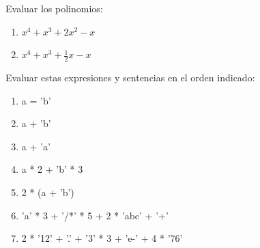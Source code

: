 Evaluar los polinomios:

\begin{enumerate}
\item $x^4 + x^3 + 2x^2 − x$
\item $x^4 + x^3 + \frac{1}{2}x − x$
\end{enumerate}

Evaluar estas expresiones y sentencias en el orden indicado:

\begin{enumerate}
\item a = 'b'
\item a + 'b'
\item a + 'a'
\item a * 2 + 'b' * 3
\item 2 * (a + 'b')
\item 'a' * 3 + '/*' * 5 + 2 * 'abc' + '+'
\item 2 * '12' + '.' + '3' * 3 + 'e-' + 4 * '76'
\end{enumerate}


